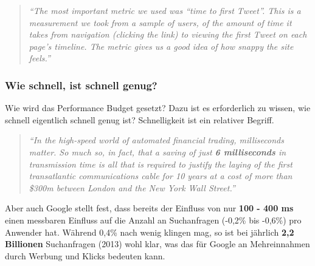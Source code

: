				\begin{quote}
					\textit{"`The most important metric we used was “time to first Tweet”. This is a measurement we took from a sample of users, of the amount of time it takes from navigation (clicking the link) to viewing the first Tweet on each page’s timeline. The metric gives us a good idea of how snappy the site feels."'} \autocite{twitter12}
				\end{quote}


			\subsubsection{Wie schnell, ist schnell genug?} %
			\label{ssub:wie_schnell_ist_schnell_genug_}
				Wie wird das Performance Budget gesetzt? Dazu ist es erforderlich zu wissen, wie schnell eigentlich schnell genug ist? Schnelligkeit ist ein relativer Begriff.

				\begin{quote}
					\textit{"`In the high-speed world of automated financial trading, milliseconds matter. So much so, in fact, that a saving of just \textbf{6 milliseconds} in transmission time is all that is required to justify the laying of the first transatlantic communications cable for 10 years at a cost of more than \$300m between London and the New York Wall Street."'} \autocite[vgl.]{telegraph11}
				\end{quote}

				Aber auch Google stellt fest, dass bereits der Einfluss von nur \textbf{100 - 400 ms} einen messbaren Einfluss auf die Anzahl an Suchanfragen (-0,2\% bis -0,6\%) pro Anwender hat.\autocite{google09} Während 0,4\% nach wenig klingen mag, so ist bei jährlich \textbf{2,2 Billionen} Suchanfragen (2013) wohl klar, was das für Google an Mehreinnahmen durch Werbung und Klicks bedeuten kann.\autocite{statista14}\\
					
